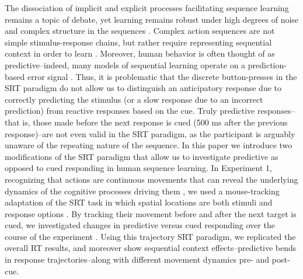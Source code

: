\documentclass[man,floatsintext]{apa6}
\begin{document}
The dissociation of implicit and explicit processes facilitating sequence learning remains a topic of debate, yet learning remains robust under high degrees of noise and complex structure in the sequences \cite{Cleeremans:1991}. Complex action sequences are not simple stimulus-response chains, but rather require representing sequential context in order to learn \cite{Lashley:1951}. Moreover, human behavior is often thought of as predictive--indeed, many models of sequential learning operate on a prediction-based error signal \cite{Botvinick:2004,KachergisPT:2014}. Thus, it is problematic that the discrete button-presses in the SRT paradigm do not allow us to distinguish an anticipatory response due to correctly predicting the stimulus (or a slow response due to an incorrect prediction) from reactive responses based on the cue. Truly predictive responses--that is, those made before the next response is cued (500 ms after the previous response)--are not even valid in the SRT paradigm, as the participant is arguably unaware of the repeating nature of the sequence. In this paper we introduce two modifications of the SRT paradigm that allow us to investigate predictive as opposed to cued responding in human sequence learning. In Experiment 1, recognizing that actions are continuous movements that can reveal the underlying dynamics of the cognitive processes driving them \cite{Spivey:2006}, we used a mouse-tracking adaptation of the SRT task in which spatial locations are both stimuli and response options \cite{Kachergis:2014b,Kachergis:2014a}. By tracking their movement before and after the next target is cued, we investigated changes in predictive versus cued responding over the course of the experiment \cite{Tubau:2007}. Using this trajectory SRT paradigm, we replicated the overall  RT results, and moreover show sequential context effects--predictive bends in response trajectories--along with different movement dynamics pre- and post-cue.
\end{document}
